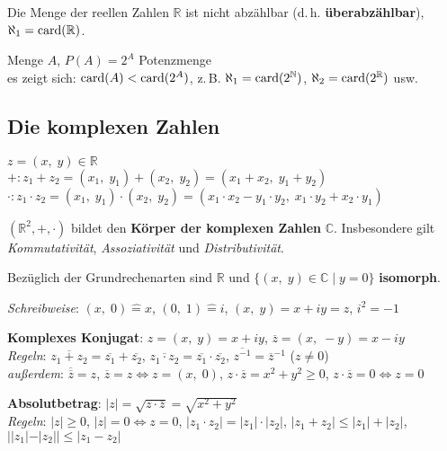 Die Menge der reellen Zahlen $\mathbb{R}$ ist nicht abzählbar
(d.\,h. \textbf{überabzählbar}),
$\aleph_1 = \operatorname{card}(\mathbb{R})$.

Menge $A$, $P(A) = 2^A$ Potenzmenge \\
es zeigt sich: $\operatorname{card}(A) < \operatorname{card}(2^A)$,
z.\,B. $\aleph_1 = \operatorname{card}(2^{\mathbb{N}})$,
$\aleph_2 = \operatorname{card}(2^{\mathbb{R}})$ usw.

\pagebreak

\subsection{%
    Die komplexen Zahlen%
}

$z = (x,\; y) \in \mathbb{R}$ \\
$\boldsymbol{+}: z_1 + z_2 = (x_1,\; y_1) + (x_2,\; y_2) =
(x_1 + x_2,\; y_1 + y_2)$ \\
$\boldsymbol{\cdot}: z_1 \cdot z_2 = (x_1,\; y_1) \cdot (x_2,\; y_2) =
(x_1 \cdot x_2 - y_1 \cdot y_2,\; x_1 \cdot y_2 + x_2 \cdot y_1)$

$(\mathbb{R}^2, +, \cdot)$ bildet den \textbf{Körper der komplexen Zahlen}
$\mathbb{C}$. Insbesondere gilt \emph{Kommutativität}, \emph{Assoziativität}
und \emph{Distributivität}.

Bezüglich der Grundrechenarten sind $\mathbb{R}$ und
$\{(x,\; y) \in \mathbb{C} \;|\; y = 0\}$ \textbf{isomorph}.

\emph{Schreibweise}:
$(x,\; 0) \mathrel{\widehat{=}} x$, \quad
$(0,\; 1) \mathrel{\widehat{=}} i$, \quad
$(x,\; y) = x + iy = z$, \quad
$i^2 = -1$

\linie

\textbf{Komplexes Konjugat}: $z = (x,\; y) = x + iy$, \quad
$\overline{z} = (x,\; -y) = x - iy$ \\
\emph{Regeln}: $\overline{z_1 + z_2} = \overline{z_1} + \overline{z_2}$, \quad
$\overline{z_1 \cdot z_2} = \overline{z_1} \cdot \overline{z_2}$, \quad
$\overline{z^{-1}} = \overline{z}^{-1}$ ($z \not= 0$) \\
\emph{außerdem}: $\overline{\overline{z}} = z$, \quad
$\overline{z} = z \Leftrightarrow z = (x,\; 0)$, \quad
$z \cdot \overline{z} = x^2 + y^2 \ge 0$, \quad
$z \cdot \overline{z} = 0 \Leftrightarrow z = 0$

\textbf{Absolutbetrag}:
$|z| = \sqrt{z \cdot \overline{z}} = \sqrt{x^2 + y^2}$ \\
\emph{Regeln}: $|z| \ge 0$, $|z| = 0 \Leftrightarrow z = 0$,
$|z_1 \cdot z_2| = |z_1| \cdot |z_2|$, $|z_1 + z_2| \le |z_1| + |z_2|$,
$||z_1| - |z_2|| \le |z_1 - z_2|$

